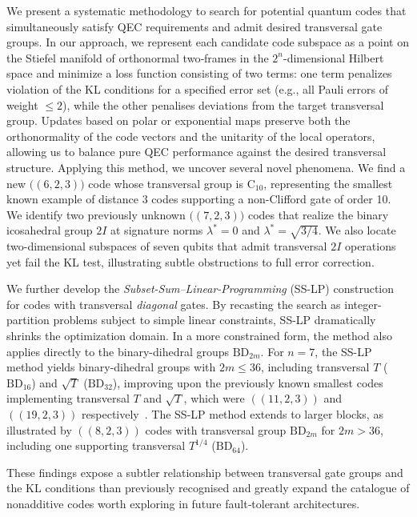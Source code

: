 \documentclass[8pt]{article}
\theoremstyle{definition}
\begin{document}
We present a systematic methodology to search for potential quantum codes that simultaneously satisfy QEC requirements and admit desired transversal gate groups. In our approach, we represent each candidate code subspace as a point on the Stiefel manifold of orthonormal two‑frames in the \(2^{n}\)-dimensional Hilbert space and minimize a loss function consisting of two terms: one term penalizes violation of the KL conditions for a specified error set (e.g., all Pauli errors of weight \(\le 2\)), while the other penalises deviations from the target transversal group.
Updates based on polar or exponential maps preserve both the orthonormality of the code vectors and the unitarity of the local operators, allowing us to balance pure QEC performance against the desired transversal structure. Applying this method, we uncover several novel phenomena. We find a new \(\bigl((6,2,3)\bigr)\) code whose transversal group is \(\mathrm{C}_{10}\), representing the smallest known example of distance $3$ codes supporting a non-Clifford gate of order 10. We identify two previously unknown \(\bigl((7,2,3)\bigr)\) codes that realize the binary icosahedral group \(2I\) at signature norms \(\lambda^*=0\) and \(\lambda^*=\sqrt{3/4}\). We also locate two-dimensional subspaces of seven qubits that admit transversal \(2I\) operations yet fail the KL test, illustrating subtle obstructions to full error correction.

We further develop the \emph{Subset-Sum–Linear-Programming} (SS-LP) construction for codes with transversal \emph{diagonal} gates. By recasting the search as integer-partition problems subject to simple linear constraints, SS-LP dramatically shrinks the optimization domain. In a more constrained form, the method also applies directly to the binary-dihedral groups $\mathrm{BD}_{2m}$. For $n=7$, the SS-LP method yields binary-dihedral groups with $2m \leq 36$, including transversal $T$ ($\mathrm{BD}_{16}$) and $\sqrt{T}$ ($\mathrm{BD}_{32}$), improving upon the previously known smallest codes implementing transversal $T$ and $\sqrt{T}$, which were $((11,2,3))$ and $((19,2,3))$ respectively~\cite{kubischta2024permutationinvariantquantumcodestransversal}. The SS-LP method extends to larger blocks, as illustrated by $((8,2,3))$ codes with transversal group $\mathrm{BD}_{2m}$ for $2m > 36$, including one supporting transversal $T^{1/4}$ ($\mathrm{BD}_{64}$).

These findings expose a subtler relationship between transversal gate groups
and the KL conditions than previously recognised and greatly expand the
catalogue of nonadditive codes worth exploring in future fault‑tolerant
architectures.
\end{document}
